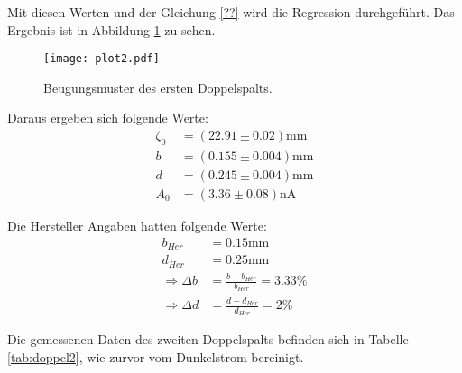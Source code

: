 Mit diesen Werten und der Gleichung \eqref{??} wird die Regression durchgeführt.
Das Ergebnis ist in Abbildung \ref{fig:plot2} zu sehen.

\begin{figure}
  \centering
  \texttt{[image: plot2.pdf]}
  \caption{Beugungsmuster des ersten Doppelspalts.}
  \label{fig:plot2}
\end{figure}
\FloatBarrier

Daraus ergeben sich folgende Werte:
\begin{align*}
  \zeta_0 &= (22.91 \pm 0.02) \text{mm} \\
  b &= (0.155 \pm 0.004) \text{mm} \\
  d &= (0.245 \pm 0.004) \text{mm} \\
  A_0 &= (3.36 \pm 0.08) \text{nA}
\end{align*}

Die Hersteller Angaben hatten folgende Werte:
\begin{align*}
  b_{Her} &= 0.15 \text{mm} \\
  d_{Her} &= 0.25 \text{mm} \\
  \Rightarrow \Delta b &= \frac{b - b_{Her}}{b_{Her}} = 3.33\% \\
  \Rightarrow \Delta d &= \frac{d - d_{Her}}{d_{Her}} = 2\%
\end{align*}

Die gemessenen Daten des zweiten Doppelspalts befinden sich in Tabelle \ref{tab:doppel2}, wie zurvor vom Dunkelstrom bereinigt.

